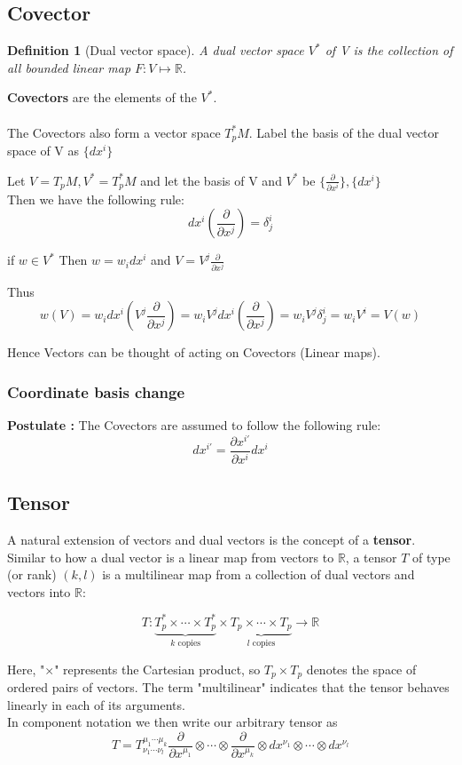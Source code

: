 \documentclass{article}
\newtheorem{defn}{Definition}[section]
\begin{document}
\subsection{Covector}
\begin{defn}[Dual vector space]
    A dual vector space $V^*$ of V is the collection of all bounded linear map $F : V \mapsto \mathbb{R} $.

\end{defn}
\textbf{Covectors} are the elements of the $V^*$.
\\ \\
The Covectors also form a vector space $T^*_p M$. 
Label the basis of the dual vector space of V as $\{ dx^i \}$

Let $V = T_pM,V^* = T^*_pM$ and let the basis of V and $V^*$ be $\{\frac{\partial}{\partial x^i}\},\{ dx^i \}$
 \\
Then we have the following rule:
$$\boxed{dx^i (\frac{\partial}{\partial x^j}) = \delta_j^i  }$$

if $w \in V^*$ Then $w = w_idx^i$ and $V = V^j \frac{\partial}{\partial x^j}$  

Thus $$w(V) = w_idx^i (V^j \frac{\partial}{\partial x^j})=w_i V^j dx^i ( \frac{\partial}{\partial x^j}) = w_i V^j \delta_j^i = w_i V^i = V(w)$$

Hence Vectors can be thought of acting on Covectors (Linear maps).

\subsubsection{Coordinate basis change }
\textbf{Postulate : }The Covectors are assumed to follow the following rule: 
$$\boxed{dx^{i'} =  \frac{\partial x^{i'}}{\partial x^i} dx^i}$$ 

\subsection{Tensor}
A natural extension of vectors and dual vectors is the concept of a \textbf{tensor}. Similar to how a dual vector is a linear map from vectors to $\mathbb{R}$, a tensor $T$ of type (or rank) $(k, l)$ is a multilinear map from a collection of dual vectors and vectors into $\mathbb{R}$:

\[
T: 
\underbrace{T_p^* \times \cdots \times T_p^*}_{k \text{ copies}} \times \underbrace{T_p \times \cdots \times T_p}_{l \text{ copies}} \to \mathbb{R} 
\]

Here, "$\times$" represents the Cartesian product, so $T_p \times T_p$ denotes the space of ordered pairs of vectors. The term "multilinear" indicates that the tensor behaves linearly in each of its arguments.
\\
In component notation we then write our arbitrary tensor as
\[
T = T^{\mu_1 \cdots \mu_k}_{\nu_1 \cdots \nu_l} \frac{\partial}{\partial x^{\mu_1}} \otimes \cdots \otimes \frac{\partial}{\partial x^{\mu_k}} \otimes dx^{\nu_1} \otimes \cdots \otimes dx^{\nu_l}
\]
\end{document}
